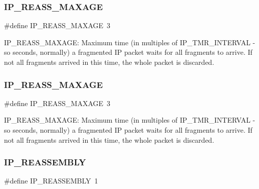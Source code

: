 \subsubsection{\texorpdfstring{I\+P\+\_\+\+R\+E\+A\+S\+S\+\_\+\+M\+A\+X\+A\+GE}{IP\_REASS\_MAXAGE}\hspace{0.1cm}{\footnotesize\ttfamily [1/2]}}
{\footnotesize\ttfamily \#define I\+P\+\_\+\+R\+E\+A\+S\+S\+\_\+\+M\+A\+X\+A\+GE~3}

I\+P\+\_\+\+R\+E\+A\+S\+S\+\_\+\+M\+A\+X\+A\+GE\+: Maximum time (in multiples of I\+P\+\_\+\+T\+M\+R\+\_\+\+I\+N\+T\+E\+R\+V\+AL -\/ so seconds, normally) a fragmented IP packet waits for all fragments to arrive. If not all fragments arrived in this time, the whole packet is discarded. \mbox{\label{group__lwip__opts__ipv4_gad41122bd0b5485a18a4415c8f953727b}} 
\subsubsection{\texorpdfstring{I\+P\+\_\+\+R\+E\+A\+S\+S\+\_\+\+M\+A\+X\+A\+GE}{IP\_REASS\_MAXAGE}\hspace{0.1cm}{\footnotesize\ttfamily [2/2]}}
{\footnotesize\ttfamily \#define I\+P\+\_\+\+R\+E\+A\+S\+S\+\_\+\+M\+A\+X\+A\+GE~3}

I\+P\+\_\+\+R\+E\+A\+S\+S\+\_\+\+M\+A\+X\+A\+GE\+: Maximum time (in multiples of I\+P\+\_\+\+T\+M\+R\+\_\+\+I\+N\+T\+E\+R\+V\+AL -\/ so seconds, normally) a fragmented IP packet waits for all fragments to arrive. If not all fragments arrived in this time, the whole packet is discarded. \mbox{\label{group__lwip__opts__ipv4_ga1a31ab0e0f37b17d40fa7c35bc2c4f69}} 
\subsubsection{\texorpdfstring{I\+P\+\_\+\+R\+E\+A\+S\+S\+E\+M\+B\+LY}{IP\_REASSEMBLY}\hspace{0.1cm}{\footnotesize\ttfamily [1/2]}}
{\footnotesize\ttfamily \#define I\+P\+\_\+\+R\+E\+A\+S\+S\+E\+M\+B\+LY~1}

